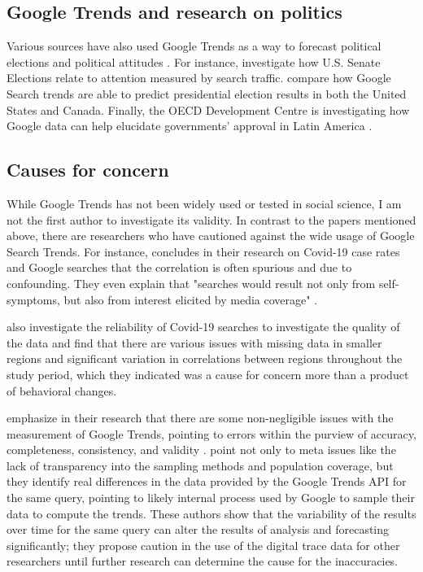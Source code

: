 \subsection{Google Trends and research on politics}

Various sources have also used Google Trends as a way to forecast
political elections and political attitudes
\citep{wolfTrendingRightDirection2018}. For instance,
\citet{swearingenGoogleInsightsSenate2014} investigate how U.S. Senate
Elections relate to attention measured by search traffic.
\citet{prado-romanGoogleTrendsPredictor2020} compare how Google Search trends
are able to predict presidential election results in both the United
States and Canada. Finally, the OECD Development Centre is investigating
how Google data can help elucidate governments' approval in Latin
America \citep{montoyaUsingGoogleData2020}. 

\subsection{Causes for concern}

While Google Trends has not been widely used or tested in social science,
I am not the first author to investigate its validity.
In contrast to the papers mentioned above, there are researchers who have cautioned against
the wide usage of Google Search Trends. For instance, \citet{asseoTrackingCOVID19Using2020} 
concludes in their research on Covid-19 case rates and Google searches that the correlation 
is often spurious and due to confounding. They even explain that "searches would
result not only from self-symptoms, but also from interest elicited by
media coverage" \citep[][p.1]{asseoTrackingCOVID19Using2020}.

\citet{rovetta21} also investigate the reliability of Covid-19 searches to investigate the quality of the data and find that there are various issues with missing data in smaller regions and significant variation in correlations between regions throughout the study period, which they indicated was a cause for concern more than a product of behavioral changes. 

\citet{cebrian_domenech22} emphasize in their research that there are some 
non-negligible issues with the measurement of Google Trends, pointing to 
errors within the purview of accuracy, completeness, consistency, and validity \citep{KarrDataQuality}. \citet{cebrian_domenech22} point not only to 
meta issues like the lack of transparency into the sampling methods 
and population coverage, but they identify real differences 
in the data provided by the Google Trends API for the same query, pointing
to likely internal process used by Google to sample their data to compute the trends.
These authors show that the variability of the results over time for the same query
can alter the results of analysis and forecasting significantly; they propose
caution in the use of the digital trace data for other researchers until
further research can determine the cause for the inaccuracies. 

